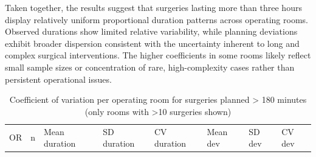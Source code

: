\documentclass[
]{article}
\begin{document}
Taken together, the results suggest that surgeries lasting more than
three hours display relatively uniform proportional duration patterns
across operating rooms. Observed durations show limited relative
variability, while planning deviations exhibit broader dispersion
consistent with the uncertainty inherent to long and complex surgical
interventions. The higher coefficients in some rooms likely reflect
small sample sizes or concentration of rare, high-complexity cases
rather than persistent operational issues.

\begin{longtable}[]{@{}
  >{\centering\arraybackslash}p{}
  >{\centering\arraybackslash}p{}
  >{\centering\arraybackslash}p{}
  >{\centering\arraybackslash}p{}
  >{\centering\arraybackslash}p{}
  >{\centering\arraybackslash}p{}
  >{\centering\arraybackslash}p{}
  >{\centering\arraybackslash}p{}@{}}
\caption{Coefficient of variation per operating room for surgeries
planned \textgreater{} 180 minutes (only rooms with \textgreater10
surgeries shown) \label{tab:cv_room_over180}}\tabularnewline
\toprule\noalign{}
\begin{minipage}[b]{\linewidth}\centering
OR
\end{minipage} & \begin{minipage}[b]{\linewidth}\centering
n
\end{minipage} & \begin{minipage}[b]{\linewidth}\centering
Mean duration
\end{minipage} & \begin{minipage}[b]{\linewidth}\centering
SD duration
\end{minipage} & \begin{minipage}[b]{\linewidth}\centering
CV duration
\end{minipage} & \begin{minipage}[b]{\linewidth}\centering
Mean dev
\end{minipage} & \begin{minipage}[b]{\linewidth}\centering
SD dev
\end{minipage} & \begin{minipage}[b]{\linewidth}\centering
CV dev
\end{minipage} \\

\end{longtable}
\end{document}
